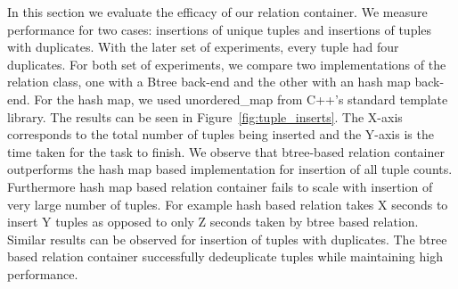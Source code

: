In this section we evaluate the efficacy of our relation container.
We measure performance for two cases: insertions of unique tuples and insertions of tuples with duplicates. With the later set of experiments, every tuple had four duplicates. For both set of experiments, we compare two implementations of the relation class, one with a Btree back-end and the other with an hash map back-end. For the hash map, we used unordered\_map from C++'s standard template library. The results can be seen in Figure~\ref{fig:tuple_inserts}. The X-axis corresponds to the total number of tuples being inserted and the Y-axis is the time taken for the task to finish. We observe that btree-based relation container outperforms the hash map based implementation for insertion of all tuple counts. Furthermore hash map based relation container fails to scale with insertion of very large number of tuples. For example hash based relation takes X seconds to insert Y tuples as opposed to only Z seconds taken by btree based relation. Similar results can be observed for insertion of tuples with duplicates. The btree based relation container successfully dedeuplicate tuples while maintaining high performance.





